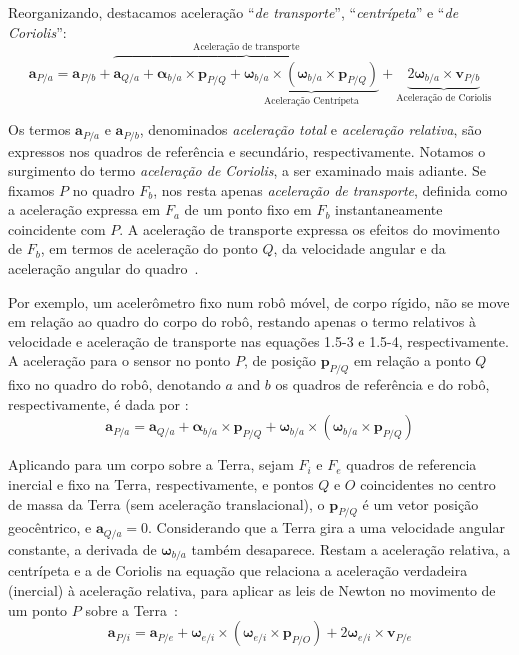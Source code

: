 Reorganizando, destacamos aceleração ``\emph{de transporte}'', ``\emph{centrípeta}'' e ``\emph{de Coriolis}'':
\begin{equation*}
    \mathbf{a}_{P/a} = \mathbf{a}_{P/b} + \overbrace{\mathbf{a}_{Q/a} + {{\mathbf{\alpha}_{b/a}}\!\times\!{\mathbf{p}_{P/Q}}} + \underbrace{{{\mathbf{\omega}_{b/a}}\!\times\!{\left({\mathbf{\omega}_{b/a}}\!\times\!{\mathbf{p}_{P/Q}}\right)}}}_{\text{Aceleração Centrípeta}}}^{\text{Aceleração de transporte}} + \underbrace{{2\mathbf{\omega}_{b/a}\!\times\!\mathbf{v}_{P/b}}}_{\text{Aceleração de Coriolis}} \tag{1.5-4}
\end{equation*}


Os termos \(\mathbf{a}_{P/a}\) e \(\mathbf{a}_{P/b}\), denominados \emph{aceleração total} e \emph{aceleração relativa}, são expressos nos quadros de referência e secundário, respectivamente. Notamos o surgimento do termo \textit{aceleração de Coriolis}, a ser examinado mais adiante. Se fixamos \(P\) no quadro \(F_{b}\), nos resta apenas \textit{aceleração de  transporte}, definida como a aceleração expressa em \(F_{a}\) de um ponto fixo em \(F_{b}\) instantaneamente coincidente com \(P\). A aceleração de transporte expressa os efeitos do movimento de \(F_{b}\), em termos de aceleração do ponto \(Q\), da velocidade angular e da aceleração angular do quadro~\cite{Stevens2016}. 


Por exemplo, um acelerômetro fixo num robô móvel, de corpo rígido, não se move em relação ao quadro do corpo do robô, restando apenas o termo relativos à velocidade e aceleração de transporte nas equações 1.5-3 e 1.5-4, respectivamente. A aceleração para o sensor no ponto \(P\), de posição \(\mathbf{p}_{P/Q}\) em relação a ponto \(Q\) fixo no quadro do robô, denotando \(a\) and \(b\) os quadros de referência e do robô, respectivamente, é dada por \cite{Stevens2016}:
\begin{equation*}
    {\mathbf{a}_{P/a}} = {\mathbf{a}_{Q/a}} + {\mathbf{\alpha}_{b/a}}\!\times\!{\mathbf{p}_{P/Q}} + {\mathbf{\omega}_{b/a}}\!\times\!\left({\mathbf{\omega}_{b/a}}\!\times\!{\mathbf{p}_{P/Q}}\right)
\end{equation*}

Aplicando para um corpo sobre a Terra, sejam \(F_{i}\)  e  \(F_{e}\) quadros de referencia inercial e fixo na Terra, respectivamente, e pontos \(Q\) e \(O\) coincidentes no centro de massa da Terra (sem aceleração translacional), o \(\mathbf{p}_{P/Q}\) é um vetor posição geocêntrico, e \(\mathbf{a}_{Q/a}=0\). Considerando que a Terra gira a uma velocidade angular constante, a derivada de \(\mathbf{\omega}_{b/a}\) também desaparece. Restam a aceleração relativa, a centrípeta e a de Coriolis na equação que relaciona a aceleração verdadeira (inercial) à aceleração relativa, para aplicar as leis de Newton no movimento de um ponto \(P\) sobre a Terra~\cite{Stevens2016}:
\begin{equation*} \tag{1.5-5}
    {\mathbf{a}_{P/i}} = {\mathbf{a}_{P/e}} + {\mathbf{\omega}_{e/i}}\!\times\!\left({\mathbf{\omega}_{e/i}}\!\times\!{\mathbf{p}_{P/O}}\right) + 2\mathbf{\omega}_{e/i}\!\times\!\mathbf{v}_{P/e}
\end{equation*}

